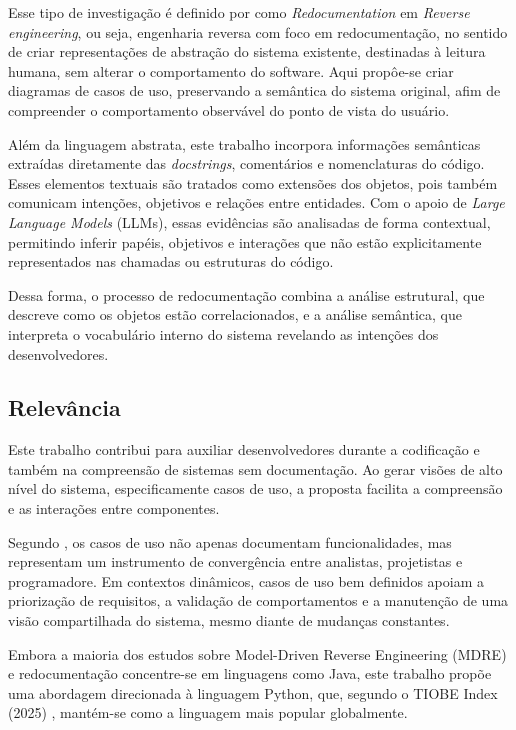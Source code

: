 \documentclass[12pt,a4paper]{article}
\begin{document}
Esse tipo de investigação é definido por \textcite{chikofsky1990reverse} como \textit{Redocumentation} em \textit{Reverse engineering}, ou seja, engenharia reversa com foco em redocumentação, no sentido de criar representações de abstração do sistema existente, destinadas à leitura humana, sem alterar o comportamento do software. Aqui propôe-se criar diagramas de casos de uso, preservando a semântica do sistema original, afim de compreender o comportamento observável do ponto de vista do usuário.

Além da linguagem abstrata, este trabalho incorpora informações semânticas extraídas diretamente das \textit{docstrings}, comentários e nomenclaturas do código. Esses elementos textuais são tratados como extensões dos objetos, pois também comunicam intenções, objetivos e relações entre entidades. Com o apoio de \textit{Large Language Models} (LLMs), essas evidências são analisadas de forma contextual, permitindo inferir papéis, objetivos e interações que não estão explicitamente representados nas chamadas ou estruturas do código.

Dessa forma, o processo de redocumentação combina a análise estrutural, que descreve como os objetos estão correlacionados, e a análise semântica, que interpreta o vocabulário interno do sistema revelando as intenções dos desenvolvedores. 

\subsection{Relevância}

Este trabalho contribui para auxiliar desenvolvedores durante a codificação e também na compreensão de sistemas sem documentação. Ao gerar visões de alto nível do sistema, especificamente casos de uso, a proposta facilita a compreensão e as interações entre componentes. 

Segundo \textcite{larman2002applying}, os casos de uso não apenas documentam funcionalidades, mas representam um instrumento de convergência entre analistas, projetistas e programadore. Em contextos dinâmicos, casos de uso bem definidos apoiam a priorização de requisitos, a validação de comportamentos e a manutenção de uma visão compartilhada do sistema, mesmo diante de mudanças constantes.

Embora a maioria dos estudos sobre Model-Driven Reverse Engineering (MDRE) e redocumentação concentre-se em linguagens como Java, este trabalho propõe uma abordagem direcionada à linguagem Python, que, segundo o TIOBE Index (2025) \parencite{tiobe2025}, mantém-se como a linguagem mais popular globalmente. 
\end{document}
